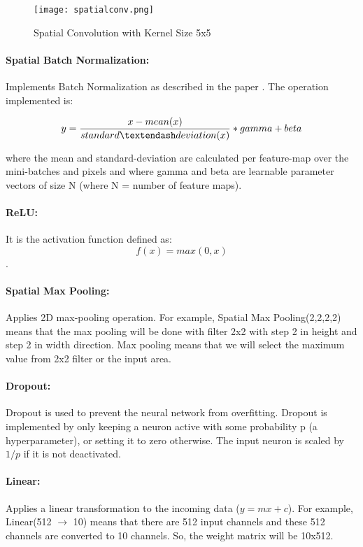  \begin{figure}[h!]
  \centering
  \texttt{[image: spatialconv.png]}
  \caption{Spatial Convolution with Kernel Size 5x5} \label{spatialconv}
\end{figure}

\paragraph{Spatial Batch Normalization:}

Implements Batch Normalization as described in the paper \cite{6}. The operation implemented is:

 $$y=\frac{x - mean(x)}{standard \textendash deviation(x)} * gamma + beta$$
 
 where the mean and standard-deviation are calculated per feature-map over the mini-batches and pixels and where gamma and beta are learnable parameter vectors of size N (where N = number of feature maps).
 
 
 \paragraph{ReLU:}
 It is the activation function defined as: $$f(x) = max(0,x)$$.
 
 
 \paragraph{Spatial Max Pooling:}
 Applies 2D max-pooling operation. For example, Spatial Max Pooling(2,2,2,2) means that the max pooling will be done with filter 2x2 with step 2 in height and step 2 in width direction. Max pooling means that we will select the maximum value from 2x2 filter or the input area.
 
 
 \paragraph{Dropout:}
 Dropout is used to prevent the neural network from overfitting. Dropout is implemented by only keeping a neuron active with some probability p (a hyperparameter), or setting it to zero otherwise. The input neuron is scaled by $1/p$ if it is not deactivated.
 
 \paragraph{Linear:}
 Applies a linear transformation to the incoming data ($y = mx + c$). For example, Linear(512 \(\rightarrow\) 10) means that there are 512 input channels and these 512 channels are converted to 10 channels. So, the weight matrix will be 10x512. 
 
